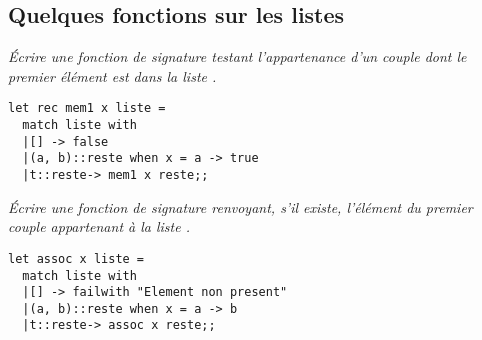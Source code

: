 \subsection{Quelques fonctions sur les listes}
\begin{Exercise}\it
Écrire une fonction  de signature  testant l’appartenance d’un couple dont le premier élément
est  dans la liste .
\end{Exercise}
\begin{Answer}
\begin{lstlisting}
let rec mem1 x liste = 
  match liste with
  |[] -> false
  |(a, b)::reste when x = a -> true
  |t::reste-> mem1 x reste;;
\end{lstlisting}
\end{Answer}

\begin{Exercise}\it
Écrire une fonction  de signature  renvoyant, s’il existe, l’élément  du premier couple
 appartenant à la liste .
\end{Exercise}
\begin{Answer}
\begin{lstlisting}
let assoc x liste = 
  match liste with
  |[] -> failwith "Element non present"
  |(a, b)::reste when x = a -> b
  |t::reste-> assoc x reste;;
\end{lstlisting}
\end{Answer}

